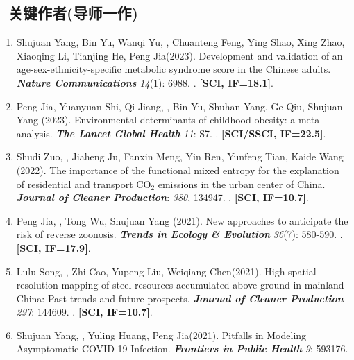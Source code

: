 \subsection*{\texorpdfstring{\faBook\ 关键作者(导师一作)}{关键作者(导师一作)}}
\begin{enumerate}
\item
    Shujuan Yang, Bin Yu, Wanqi Yu, \Shaoqing, Chuanteng Feng, Ying Shao, Xing Zhao, Xiaoqing Li, Tianjing He, Peng Jia\CS (2023).
    Development and validation of an age-sex-ethnicity-specific metabolic syndrome score in the Chinese adults.
    \textbf{\textit{Nature Communications}} \textit{14}(1): 6988.
    . \textbf{[SCI, IF=18.1]}.
\item
    Peng Jia\CS, Yuanyuan Shi, Qi Jiang, \Shaoqing, Bin Yu, Shuhan Yang, Ge Qiu, Shujuan Yang (2023).
    Environmental determinants of childhood obesity: a meta-analysis.
    \textbf{\textit{The Lancet Global Health}} \textit{11}: S7.
    . 
    \textbf{[SCI/SSCI, IF=22.5]}.
\item
    Shudi Zuo\CS, \Shaoqing, Jiaheng Ju, Fanxin Meng, Yin Ren, Yunfeng Tian, Kaide Wang (2022).
    The importance of the functional mixed entropy for the explanation of residential and transport CO$_2$ emissions in the urban center of China.
    \textbf{\textit{Journal of Cleaner Production}}: \textit{380}, 134947.
    . \textbf{[SCI, IF=10.7]}.
\item
    Peng Jia\CS, \Shaoqing, Tong Wu, Shujuan Yang (2021).
    New approaches to anticipate the risk of reverse zoonosis.
    \textbf{\textit{Trends in Ecology \& Evolution}} \textit{36}(7): 580-590.
    . 
    \textbf{[SCI, IF=17.9]}.
\item
    Lulu Song, \Shaoqing, Zhi Cao, Yupeng Liu, Weiqiang Chen\CS (2021).
    High spatial resolution mapping of steel resources accumulated above ground in mainland China: Past trends and future prospects.
    \textbf{\textit{Journal of Cleaner Production}} \textit{297}: 144609.
    . 
    \textbf{[SCI, IF=10.7]}.
\item
    Shujuan Yang, \Shaoqing, Yuling Huang, Peng Jia\CS (2021).
    Pitfalls in Modeling Asymptomatic COVID-19 Infection.
    \textbf{\textit{Frontiers in Public Health}} \textit{9}: 593176.

\end{enumerate}
